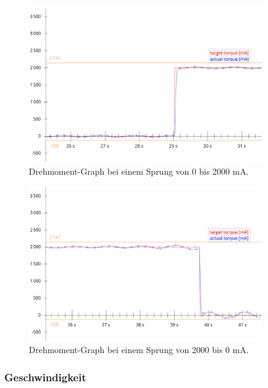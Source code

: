 \begin{figure}[H]
\center
\includegraphics[width = 0.9\textwidth]{graphics/PI_Torque_Graph_0}
\caption{Drehmoment-Graph bei einem Sprung von 0 bis 2000 mA.}
\label{fig:PI_Torque_Graph_0}
\end{figure}

\begin{figure}[H]
\center
\includegraphics[width = 0.9\textwidth]{graphics/PI_Torque_Graph_1}
\caption{Drehmoment-Graph bei einem Sprung von 2000 bis 0 mA.}
\label{fig:PI_Torque_Graph_1}
\end{figure}

\subsubsection{Geschwindigkeit}\label{Appendix:PI_Velocity}

